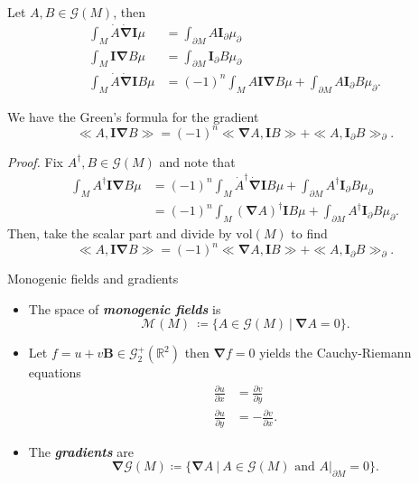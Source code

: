 \documentclass[aspectratio=169,handout]{beamer}
\newcommand\boldgreen[1]{\textcolor{lighter_csu_green}{\emph{\textbf{#1}}}}
\newcommand{\R}{\mathbb{R}}
\newcommand{\grad}{\boldsymbol{\nabla}}
\newcommand{\G}{\mathcal{G}}
\newcommand{\blade}[1]{\boldsymbol{#1}}
\newcommand{\multivecinnerproduct}[2]{\ll #1, #2\gg}
\newcommand{\boundary}{{\partial M}}
\newcommand{\pseudoscalar}{\blade{I}}
\newcommand{\monogenicfields}[1]{\mathcal{M}^{#1}(M)}
\begin{document}
\begin{frame}{}
\vfill
\begin{theorem}
Let $A,B \in \G(M)$, then
\begin{align*}
\int_M \dot{A}\dot{\grad}\pseudoscalar \mu &= \int_\boundary A \pseudoscalar_\partial \mu_\partial\\
\int_M \pseudoscalar \grad B \mu &= \int_\boundary \pseudoscalar_\partial B\mu_\partial\\
\int_M \dot{A}\dot{\grad} \pseudoscalar B \mu &= (-1)^n \int_M A \pseudoscalar \grad B \mu + \int_\boundary A \pseudoscalar_\partial B \mu_\partial.
\end{align*}
\end{theorem}
\vfill
\end{frame}

\begin{frame}{}
\vfill
\begin{theorem}
We have the Green's formula for the gradient
\[
\multivecinnerproduct{A}{\pseudoscalar \grad B} = (-1)^n \multivecinnerproduct{\grad A}{\pseudoscalar B} + \multivecinnerproduct{A}{\pseudoscalar_\partial B}_\partial.
\]
\end{theorem}

\emph{Proof.} Fix $A^\dagger,B \in \G(M)$ and note that
\begin{align*}
    \int_M A^\dagger \pseudoscalar \grad B \mu &= (-1)^n \int_M \dot{A}^\dagger \dot{\grad} \pseudoscalar B \mu + \int_{\partial M} A^\dagger \pseudoscalar_\partial B \mu_\partial\\
    &=(-1)^n \int_M (\grad A)^\dagger \pseudoscalar B \mu + \int_{\partial M} A^\dagger \pseudoscalar_\partial B \mu_\partial.
\end{align*}
Then, take the scalar part and divide by $\textrm{vol}(M)$ to find
\[
\multivecinnerproduct{A}{\pseudoscalar \grad B} = (-1)^n \multivecinnerproduct{\grad A}{\pseudoscalar B} + \multivecinnerproduct{A}{\pseudoscalar_\partial B}_\partial.
\]
\vfill
\end{frame}


\begin{frame}{Monogenic fields and gradients}
\vfill
\begin{itemize}
\item The space of \boldgreen{monogenic fields} is
\[
\monogenicfields{} ~\coloneqq \{ A \in \G(M) ~\vert~ \grad A = 0 \}.
\]

\item Let $f=u+v\blade{B} \in \G_2^+(\R^2)$ then $\grad f = 0$ yields the Cauchy-Riemann equations
\begin{align*}
    \frac{\partial u}{\partial x} &= \frac{\partial v}{\partial y}\\
    \frac{\partial u}{\partial y} &= -\frac{\partial v}{\partial x}.
\end{align*}

\item The \boldgreen{gradients} are 
\[
\grad \G(M) \coloneqq \{\grad A ~\vert~ A \in \G(M) \textrm{~and~} A\vert_\boundary = 0 \}.
\]
\end{itemize}
\vfill
\end{frame}
\end{document}
